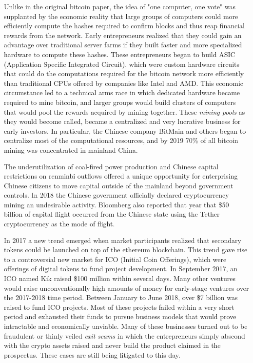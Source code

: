 
Unlike in the original bitcoin paper, the idea of "one computer, one vote" was
supplanted by the economic reality that large groups of computers could more
efficiently compute the hashes required to confirm blocks and thus reap
financial rewards from the network. Early entrepreneurs realized that they could
gain an advantage over traditional server farms if they built faster and more
specialized hardware to compute these hashes. These entrepreneurs began to build
ASIC (Application Specific Integrated Circuit), which were custom hardware
circuits that could do the computations required for the bitcoin network more
efficiently than traditional CPUs offered by companies like Intel and AMD. This
economic circumstance led to a technical arms race in which dedicated hardware
became required to mine bitcoin, and larger groups would build clusters of
computers that would pool the rewards acquired by mining together. These
\textit{mining pools} as they would become called, became a centralized and very
lucrative business for early investors. In particular, the Chinese company
BitMain and others began to centralize most of the computational resources, and
by 2019 70\% of all bitcoin mining was concentrated in mainland China.


The underutilization of coal-fired power production and Chinese capital
restrictions on renminbi outflows offered a unique opportunity for enterprising
Chinese citizens to move capital outside of the mainland beyond government
controls. In 2018 the Chinese government officially declared cryptocurrency
mining an undesirable activity. Bloomberg also reported that year that \$50
billion of capital flight occurred from the Chinese state using the Tether
cryptocurrency as the mode of flight. \cite{leising_crypto_2020}


In 2017 a new trend emerged when market participants realized that secondary
tokens could be launched on top of the ethereum blockchain. This trend gave rise
to a controversial new market for ICO (Initial Coin Offerings), which were
offerings of digital tokens to fund project development. In September 2017, an
ICO named Kik raised \$100 million within several days. Many other ventures
would raise unconventionally high amounts of money for early-stage ventures over
the 2017-2018 time period. Between January to June 2018, over \$7 billion was
raised to fund ICO projects. Most of these projects failed within a very short
period and exhausted their funds to pursue business models that would prove
intractable and economically unviable. Many of these businesses turned out to be
fraudulent or thinly veiled \textit{exit scams} in which the entrepreneurs simply
abscond with the crypto assets raised and never build the product claimed in the
prospectus. These cases are still being litigated to this day.

